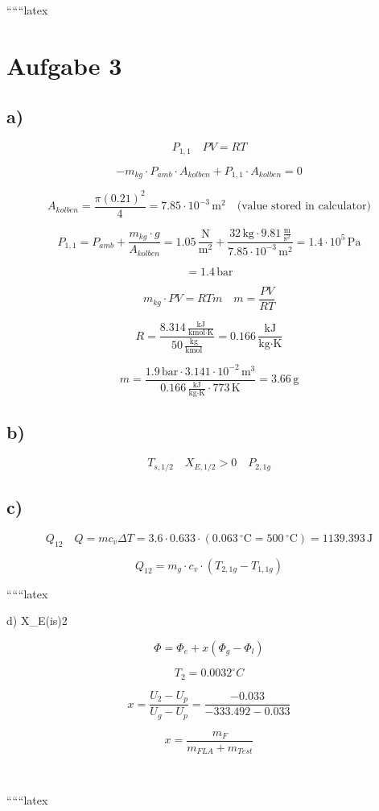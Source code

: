 
``````latex


\section*{Aufgabe 3}

\subsection*{a)}

\[
P_{1,1} \quad PV = RT
\]

\[
-m_{kg} \cdot P_{amb} \cdot A_{kolben} + P_{1,1} \cdot A_{kolben} = 0
\]

\[
A_{kolben} = \frac{\pi (0.21)^2}{4} = 7.85 \cdot 10^{-3} \, \text{m}^2 \quad \text{(value stored in calculator)}
\]

\[
P_{1,1} = P_{amb} + \frac{m_{kg} \cdot g}{A_{kolben}} = 1.05 \, \frac{\text{N}}{\text{m}^2} + \frac{32 \, \text{kg} \cdot 9.81 \, \frac{\text{m}}{\text{s}^2}}{7.85 \cdot 10^{-3} \, \text{m}^2} = 1.4 \cdot 10^5 \, \text{Pa}
\]

\[
= 1.4 \, \text{bar}
\]

\[
m_{kg} \cdot PV = RTm \quad m = \frac{PV}{RT}
\]

\[
R = \frac{8.314 \, \frac{\text{kJ}}{\text{kmol} \cdot \text{K}}}{50 \, \frac{\text{kg}}{\text{kmol}}} = 0.166 \, \frac{\text{kJ}}{\text{kg} \cdot \text{K}}
\]

\[
m = \frac{1.9 \, \text{bar} \cdot 3.141 \cdot 10^{-2} \, \text{m}^3}{0.166 \, \frac{\text{kJ}}{\text{kg} \cdot \text{K}} \cdot 773 \, \text{K}} = 3.66 \, \text{g}
\]

\subsection*{b)}

\[
T_{s,1/2} \quad X_{E,1/2} > 0 \quad P_{2,1g}
\]

\subsection*{c)}

\[
Q_{12} \quad Q = m c_v \Delta T = 3.6 \cdot 0.633 \cdot (0.063 \, ^\circ \text{C} = 500 \, ^\circ \text{C}) = 1139.393 \, \text{J}
\]

\[
Q_{12} = m_{g} \cdot c_v \cdot (T_{2,1g} - T_{1,1g})
\]

``````latex


d) \quad X_{E(is)2}

\[
\Phi = \Phi_e + x \left( \Phi_g - \Phi_l \right)
\]

\[
T_2 = 0.0032^\circ C
\]

\[
x = \frac{U_2 - U_p}{U_g - U_p} = \frac{-0.033}{-333.492 - 0.033}
\]

\[
x = \frac{m_F}{m_{FLA} + m_{Test}}
\]

\quad {} \\
\quad {}

``````latex


